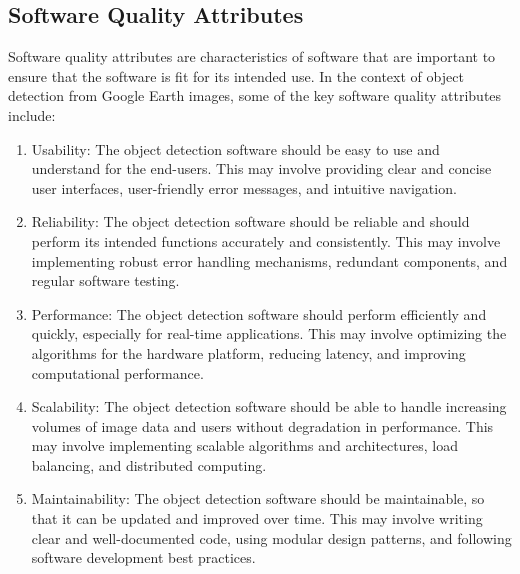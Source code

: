 \subsection{Software Quality Attributes}
		Software quality attributes are characteristics of software that are important to ensure that the software is fit for its intended use. In the context of object detection from Google Earth images, some of the key software quality attributes include:
		\begin{enumerate}
			\item Usability: The object detection software should be easy to use and understand for the end-users. This may involve providing clear and concise user interfaces, user-friendly error messages, and intuitive navigation.
			\item Reliability: The object detection software should be reliable and should perform its intended functions accurately and consistently. This may involve implementing robust error handling mechanisms, redundant components, and regular software testing.
			\item Performance: The object detection software should perform efficiently and quickly, especially for real-time applications. This may involve optimizing the algorithms for the hardware platform, reducing latency, and improving computational performance.
			\item Scalability: The object detection software should be able to handle increasing volumes of image data and users without degradation in performance. This may involve implementing scalable algorithms and architectures, load balancing, and distributed computing.
			\item Maintainability: The object detection software should be maintainable, so that it can be updated and improved over time. This may involve writing clear and well-documented code, using modular design patterns, and following software development best practices.
		\end{enumerate}
	
	

	
	
